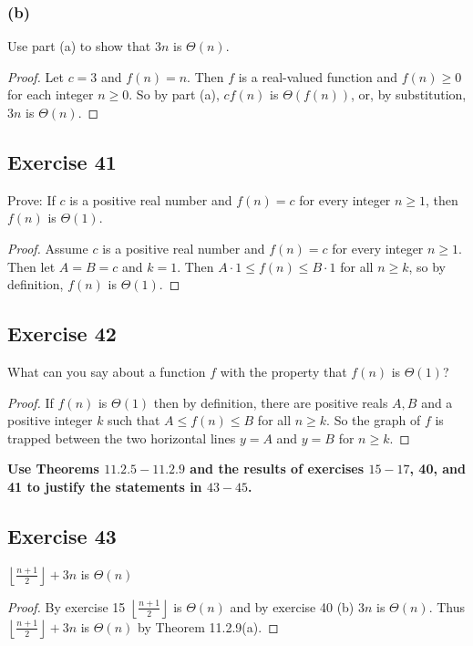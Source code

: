 \documentclass[14pt]{extarticle}
\newcommand{\dps}{\displaystyle}
\newcommand{\cy}{\color{cyan}}
\newcommand{\floor}[1]{{\left\lfloor#1\right\rfloor}}
\begin{document}
\subsubsection{(b)}
Use part (a) to show that \(3n\) is \(\Theta(n)\).
\begin{proof}
Let \(c = 3\) and \(f(n) = n\). Then \(f\) is a real-valued function and \(f(n) \geq 0\) for each integer \(n \geq 0\). So 
by part (a), \(cf(n)\) is \(\Theta(f(n))\), or, by substitution, \(3n\) is \(\Theta(n)\).
\end{proof}

\subsection{Exercise 41}
Prove: If \(c\) is a positive real number and \(f(n) = c\) for every integer \(n \geq 1\), then \(f(n)\) is \(\Theta(1)\).

\begin{proof}
Assume \(c\) is a positive real number and \(f(n) = c\) for every integer \(n \geq 1\). Then let \(A = B= c\) and \(k=1\).
Then \(A \cdot 1 \leq f(n) \leq B \cdot 1\) for all \(n \geq k\), so by definition, \(f(n)\) is \(\Theta(1)\).
\end{proof}

\subsection{Exercise 42}
What can you say about a function \(f\) with the property that \(f(n)\) is \(\Theta(1)\)? 

\begin{proof}
If \(f(n)\) is \(\Theta(1)\) then by definition, there are positive reals \(A,B\) and a positive integer \(k\) such that 
\(A \leq f(n) \leq B\) for all \(n \geq k\). So the graph of \(f\) is trapped between the two horizontal lines \(y = A\) and
\(y = B\) for \(n \geq k\).
\end{proof}

{\bf \cy Use Theorems \(11.2.5-11.2.9\) and the results of exercises \(15-17\), 40, and 41 to justify the statements in 
\(43-45\).}

\subsection{Exercise 43}
\(\dps \floor{\frac{n+1}{2}} + 3n\) is \(\Theta(n)\)

\begin{proof}
By exercise 15 \(\dps \floor{\frac{n+1}{2}}\) is \(\Theta(n)\) and by exercise 40 (b) \(3n\) is \(\Theta(n)\). Thus 
\(\dps \floor{\frac{n+1}{2}} + 3n\) is \(\Theta(n)\) by Theorem 11.2.9(a).
\end{proof}
\end{document}
